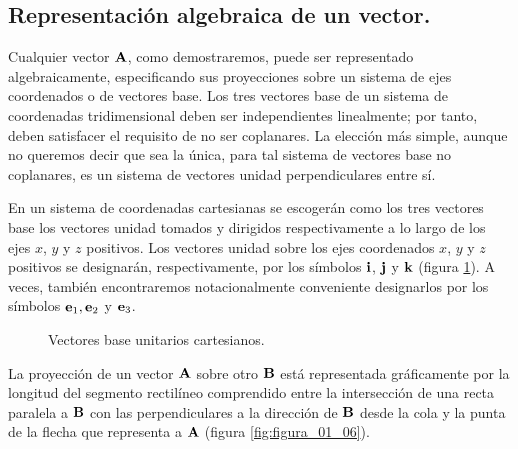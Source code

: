 \documentclass[12pt]{article}
\begin{document}
\subsection{Representación algebraica de un vector.}

Cualquier vector $\vb{A}$, como demostraremos, puede ser representado algebraicamente, especificando sus proyecciones sobre un sistema de ejes 
coordenados o de vectores base. Los tres vectores base de un sistema de coordenadas tridimensional deben ser independientes linealmente; por 
tanto, deben satisfacer el requisito de no ser coplanares. La elección más simple, aunque no queremos decir que sea la única, para tal sistema de vectores base no coplanares, es un sistema de vectores unidad perpendiculares entre sí. 
\par
En un sistema de coordenadas cartesianas se escogerán como los tres vectores base los vectores unidad tomados y dirigidos respectivamente a lo 
largo de los ejes $x$, $y$ y $z$ positivos. Los vectores unidad sobre los ejes coordenados $x$, $y$ y $z$ positivos se designarán, respectivamente, por los símbolos $\vb{i}$, $\vb{j}$ y $\vb{k}$ (figura \ref{fig:figura_01_05}). A veces, también encontraremos notacionalmente conveniente designarlos por los símbolos $\vb{e}_{1}, \vb{e}_{2}$ y $\vb{e}_{3}$.
\begin{figure}[H]
    \centering
    \caption{Vectores base unitarios cartesianos.}
    \label{fig:figura_01_05}
\end{figure}
La proyección de un vector $\vb{A}$ sobre otro $\vb{B}$ está representada gráficamente por la longitud del segmento rectilíneo comprendido entre la intersección de una recta paralela a $\vb{B}$ con las perpendiculares a la dirección de $\vb{B}$ desde la cola y la punta de la flecha que representa a $\vb{A}$ (figura \ref{fig:figura_01_06}).
\end{document}
